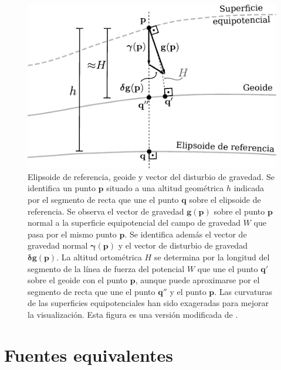 \begin{figure}
    \centering
    \includegraphics[width=\linewidth]{figs/surfaces.pdf}
    \caption{
        Elipsoide de referencia, geoide y vector del disturbio de gravedad.
        Se identifica un punto $\mathbf{p}$ situado a una altitud geométrica
        $h$ indicada por el segmento de recta que une el punto $\mathbf{q}$
        sobre el elipsoide de referencia.
        Se observa el vector de gravedad $\mathbf{g}(\mathbf{p})$ sobre el
        punto $\mathbf{p}$ normal a la superficie equipotencial del campo de
        gravedad $W$ que pasa por el mismo punto $\mathbf{p}$.
        Se identifica además el vector de gravedad normal
        $\boldsymbol\gamma(\mathbf{p})$ y el vector de disturbio de gravedad
        $\boldsymbol\delta \mathbf{g}(\mathbf{p})$.
        La altitud ortométrica $H$ se determina por la longitud del segmento de
        la línea de fuerza del potencial $W$ que une el punto $\mathbf{q'}$
        sobre el geoide con el punto $\mathbf{p}$, aunque puede aproximarse por
        el segmento de recta que une el punto $\mathbf{q''}$ y el punto
        $\mathbf{p}$.
        Las curvaturas de las superficies equipotenciales han sido exageradas
        para mejorar la visualización.
        Esta figura es una versión modificada de \citet{oliveira2021b}.
    }
    \label{fig:superficies-equipotenciales}
\end{figure}



\section{Fuentes equivalentes}

